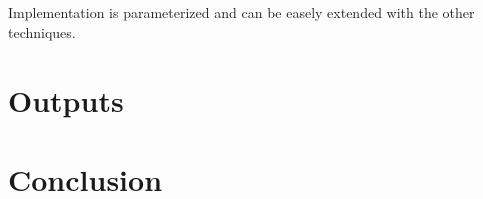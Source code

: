 \documentclass[hidelinks, english]{mvi-report}
\begin{document}
Implementation is parameterized and can be easely extended with the other techniques.


\section{Outputs}

\section{Conclusion}


\end{document}
